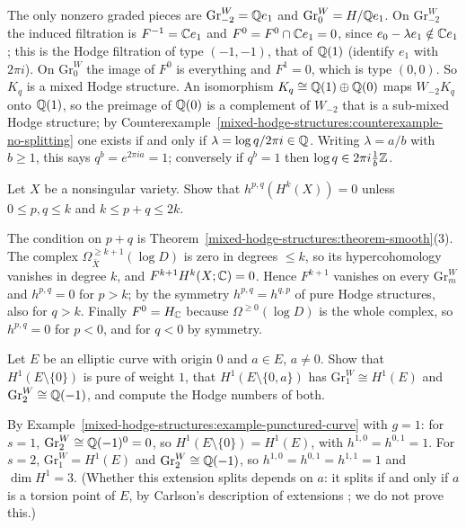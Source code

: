 \begin{solution}
The only nonzero graded pieces are $\mathrm{Gr}^W_{-2} = \mathbb{Q} e_1$ and $\mathrm{Gr}^W_0 = H/\mathbb{Q} e_1$. On $\mathrm{Gr}^W_{-2}$ the induced filtration is $F^{-1} = \mathbb{C} e_1$ and $F^0 = F^0 \cap \mathbb{C} e_1 = 0$, since
$e_0 - \lambda e_1 \notin \mathbb{C} e_1$; this is the Hodge filtration of type $(-1,-1)$, that of $\mathbb{Q}(1)$ (identify $e_1$ with $2\pi i$). On $\mathrm{Gr}^W_0$ the image of $F^0$ is everything and $F^1 = 0$, which is
type $(0,0)$. So $K_q$ is a mixed Hodge structure. An isomorphism $K_q \cong \mathbb{Q}(1) \oplus \mathbb{Q}(0)$ maps $W_{-2}K_q$ onto $\mathbb{Q}(1)$, so the preimage of $\mathbb{Q}(0)$ is a complement of $W_{-2}$ that is a
sub-mixed Hodge structure; by Counterexample~\ref{mixed-hodge-structures:counterexample-no-splitting} one exists if and only if $\lambda = \log q/2\pi i \in \mathbb{Q}$. Writing $\lambda = a/b$ with $b \geq 1$, this
says $q^b = e^{2\pi ia} = 1$; conversely if $q^b = 1$ then $\log q \in 2\pi i\frac{1}{b}\mathbb{Z}$.
\end{solution}

\begin{exercise}\label{mixed-hodge-structures:exercise-hodge-number-bounds}
Let $X$ be a nonsingular variety. Show that $h^{p,q}(H^k(X)) = 0$ unless $0 \leq p, q \leq k$ and $k \leq p + q \leq 2k$.
\end{exercise}

\begin{solution}
The condition on $p + q$ is Theorem~\ref{mixed-hodge-structures:theorem-smooth}(3). The complex $\Omega^{\geq k+1}_{\bar X}(\log D)$ is zero in degrees $\leq k$, so its hypercohomology vanishes in degree $k$, and
$F^{k+1}H^k(X; \mathbb{C}) = 0$. Hence $F^{k+1}$ vanishes on every $\mathrm{Gr}^W_m$ and $h^{p,q} = 0$ for $p > k$; by the symmetry $h^{p,q} = h^{q,p}$ of pure Hodge structures, also for $q > k$. Finally
$F^0 = H_{\mathbb{C}}$ because $\Omega^{\geq 0}(\log D)$ is the whole complex, so $h^{p,q} = 0$ for $p < 0$, and for $q < 0$ by symmetry.
\end{solution}

\begin{exercise}\label{mixed-hodge-structures:exercise-elliptic-punctured}
Let $E$ be an elliptic curve with origin $0$ and $a \in E$, $a \neq 0$. Show that $H^1(E \setminus \{0\})$ is pure of weight $1$, that $H^1(E \setminus \{0, a\})$ has $\mathrm{Gr}^W_1 \cong H^1(E)$ and $\mathrm{Gr}^W_2 \cong \mathbb{Q}(-1)$, and compute the
Hodge numbers of both.
\end{exercise}

\begin{solution}
By Example~\ref{mixed-hodge-structures:example-punctured-curve} with $g = 1$: for $s = 1$, $\mathrm{Gr}^W_2 \cong \mathbb{Q}(-1)^0 = 0$, so $H^1(E \setminus \{0\}) = H^1(E)$, with $h^{1,0} = h^{0,1} = 1$. For $s = 2$,
$\mathrm{Gr}^W_1 = H^1(E)$ and $\mathrm{Gr}^W_2 \cong \mathbb{Q}(-1)$, so $h^{1,0} = h^{0,1} = h^{1,1} = 1$ and $\dim H^1 = 3$. (Whether this extension splits depends on $a$: it splits if and only if $a$ is a torsion
point of $E$, by Carlson's description of extensions \cite{carlson-1980}; we do not prove this.)
\end{solution}
